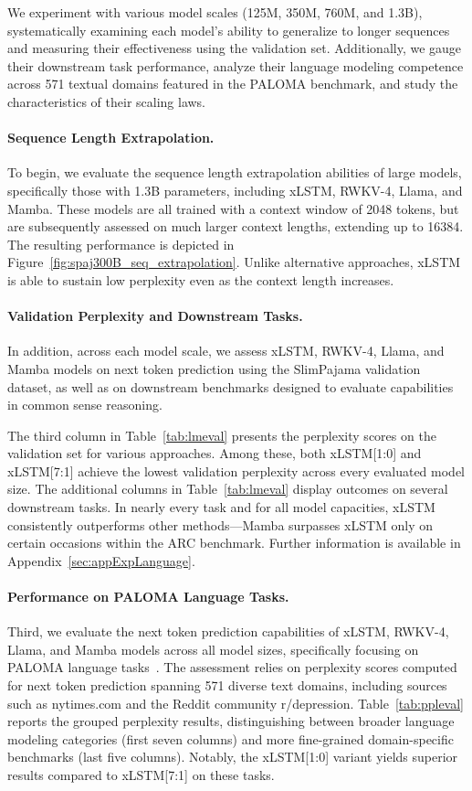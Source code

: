 We experiment with various model scales (125M, 350M, 760M, and 1.3B), systematically examining each model's ability to generalize to longer sequences and measuring their effectiveness using the validation set. Additionally, we gauge their downstream task performance, analyze their language modeling competence across 571 textual domains featured in the PALOMA benchmark, and study the characteristics of their scaling laws.

\paragraph{Sequence Length Extrapolation.}
\label{sec:spaj300B_ctx_extrapolation}
To begin, we evaluate the sequence length extrapolation abilities of large models, specifically those with 1.3B parameters, including xLSTM, RWKV-4, Llama, and Mamba. These models are all trained with a context window of 2048 tokens, but are subsequently assessed on much larger context lengths, extending up to 16384. The resulting performance is depicted in Figure~\ref{fig:spaj300B_seq_extrapolation}. Unlike alternative approaches, xLSTM is able to sustain low perplexity even as the context length increases.

\paragraph{Validation Perplexity and Downstream Tasks.}
\label{sec:spaj_downstream_eval}
In addition, across each model scale, we assess xLSTM, RWKV-4, Llama, and Mamba models on next token prediction using the SlimPajama validation dataset, as well as on downstream benchmarks designed to evaluate capabilities in common sense reasoning.

The third column in Table~\ref{tab:lmeval} presents the perplexity scores on the validation set for various approaches. Among these, both xLSTM[1:0] and xLSTM[7:1] achieve the lowest validation perplexity across every evaluated model size. The additional columns in Table~\ref{tab:lmeval} display outcomes on several downstream tasks. In nearly every task and for all model capacities, xLSTM consistently outperforms other methods—Mamba surpasses xLSTM only on certain occasions within the ARC benchmark. Further information is available in Appendix~\ref{sec:appExpLanguage}.

\paragraph{Performance on PALOMA Language Tasks.} Third, we evaluate the next token prediction capabilities of xLSTM, RWKV-4, Llama, and Mamba models across all model sizes, specifically focusing on PALOMA language tasks~\citep{Magnusson:23arxivshort}. The assessment relies on perplexity scores computed for next token prediction spanning 571 diverse text domains, including sources such as nytimes.com and the Reddit community r/depression. Table~\ref{tab:ppleval} reports the grouped perplexity results, distinguishing between broader language modeling categories (first seven columns) and more fine-grained domain-specific benchmarks (last five columns). Notably, the xLSTM[1:0] variant yields superior results compared to xLSTM[7:1] on these tasks.

